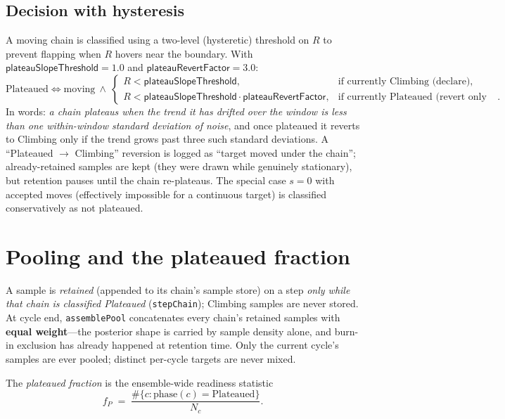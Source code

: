 \documentclass[11pt]{article}
\newcommand{\code}[1]{\texttt{\small #1}}
\newcommand{\param}[1]{\textsf{#1}}
\begin{document}
\subsection{Decision with hysteresis}
A moving chain is classified using a two-level (hysteretic) threshold on
$R$ to prevent flapping when $R$ hovers near the boundary. With
$\param{plateauSlopeThreshold}=1.0$ and
$\param{plateauRevertFactor}=3.0$:
\begin{equation}
  \text{Plateaued} \iff
  \text{moving} \ \wedge\
  \begin{cases}
    R < \param{plateauSlopeThreshold}, & \text{if currently Climbing (declare)},\\[2pt]
    R < \param{plateauSlopeThreshold}\cdot\param{plateauRevertFactor}, & \text{if currently Plateaued (revert only above)}.
  \end{cases}
  \label{eq:plateau}
\end{equation}
In words: \emph{a chain plateaus when the trend it has drifted over the
window is less than one within-window standard deviation of noise}, and
once plateaued it reverts to Climbing only if the trend grows past three
such standard deviations. A ``Plateaued $\to$ Climbing'' reversion is
logged as ``target moved under the chain''; already-retained samples are
kept (they were drawn while genuinely stationary), but retention pauses
until the chain re-plateaus. The special case $s=0$ with accepted moves
(effectively impossible for a continuous target) is classified
conservatively as not plateaued.

\section{Pooling and the plateaued fraction}

A sample is \emph{retained} (appended to its chain's sample store) on a
step \emph{only while that chain is classified Plateaued}
(\code{stepChain}); Climbing samples are never stored. At cycle end,
\code{assemblePool} concatenates every chain's retained samples with
\textbf{equal weight}---the posterior shape is carried by sample density
alone, and burn-in exclusion has already happened at retention time. Only
the current cycle's samples are ever pooled; distinct per-cycle targets
are never mixed.

The \emph{plateaued fraction} is the ensemble-wide readiness statistic
\begin{equation}
  f_P \;=\; \frac{\#\{c : \text{phase}(c)=\text{Plateaued}\}}{N_c}.
\end{equation}
\end{document}
